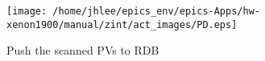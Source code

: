 \noindent
\vspace{1.4cm}
\begin{minipage}{.2\textwidth}
\begin{center}
\texttt{[image: /home/jhlee/epics\_env/epics-Apps/hw-xenon1900/manual/zint/act\_images/PD.eps]}
\end{center}
\end{minipage}
\begin{minipage}{.7\textwidth}
Push the scanned PVs to RDB
\end{minipage}


